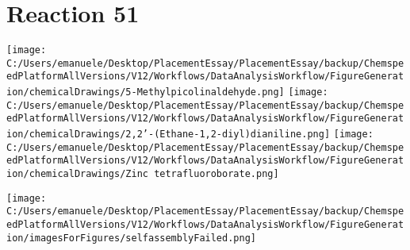 \documentclass{article}%
\begin{document}
\section*{Reaction 51}%
%
\begin{scheme}[H]%
\begin{minipage}{0.5\textwidth}%
\texttt{[image: C:/Users/emanuele/Desktop/PlacementEssay/PlacementEssay/backup/ChemspeedPlatformAllVersions/V12/Workflows/DataAnalysisWorkflow/FigureGeneration/chemicalDrawings/5-Methylpicolinaldehyde.png]}%
\texttt{[image: C:/Users/emanuele/Desktop/PlacementEssay/PlacementEssay/backup/ChemspeedPlatformAllVersions/V12/Workflows/DataAnalysisWorkflow/FigureGeneration/chemicalDrawings/2,2'-(Ethane-1,2-diyl)dianiline.png]}%
\texttt{[image: C:/Users/emanuele/Desktop/PlacementEssay/PlacementEssay/backup/ChemspeedPlatformAllVersions/V12/Workflows/DataAnalysisWorkflow/FigureGeneration/chemicalDrawings/Zinc tetrafluoroborate.png]}%
\end{minipage}%
\begin{minipage}{0.5\textwidth}%
\begin{center}%
\texttt{[image: C:/Users/emanuele/Desktop/PlacementEssay/PlacementEssay/backup/ChemspeedPlatformAllVersions/V12/Workflows/DataAnalysisWorkflow/FigureGeneration/imagesForFigures/selfassemblyFailed.png]}%
\end{center}%
\end{minipage}%
\caption{Self-assembly of components 3, 20, with Zinc(II) in a 3.0:1.5:1.0 molar ratio in CH$_3$CN at 60\textdegree C for 40h. These are the reagents (starting materials) for reaction 51.}%
\end{scheme}%
\end{document}

